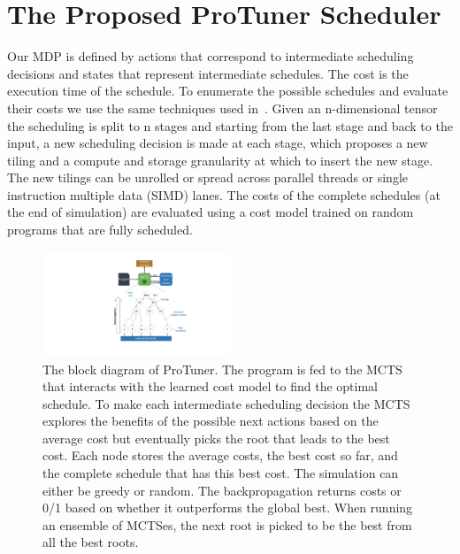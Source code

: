 \section{The Proposed ProTuner Scheduler}
Our MDP is defined by actions that correspond to intermediate scheduling decisions and states that represent intermediate schedules. The cost is the execution time of the schedule. To enumerate the possible schedules and evaluate their costs we use the same techniques used in~\cite{adams2019learning}. Given an n-dimensional tensor the scheduling is split to n stages and starting from the last stage and back to the input, a new scheduling decision is made at each stage, which proposes a new tiling and a compute and storage granularity at which to insert the new stage. The new tilings can be unrolled or spread across parallel threads or single instruction multiple data (SIMD) lanes. The costs of the complete schedules (at the end of simulation) are evaluated using a cost model trained on random programs that are fully scheduled. 
\begin{figure}[!t]
    \centering
    \includegraphics[width=0.5\textwidth,trim={12.7cm 2.5cm 7.5cm 1cm},clip]{figures/design.pdf}
    \caption{The block diagram of ProTuner. The program is fed to the MCTS that interacts with the learned cost model to find the optimal schedule. To make each intermediate scheduling decision the MCTS explores the benefits of the possible next actions based on the average cost but eventually picks the root that leads to the best cost. Each node stores the average costs, the best cost so far, and the complete schedule that has this best cost. The simulation can either be greedy or random. The backpropagation returns costs or 0/1 based on whether it outperforms the global best. When running an ensemble of MCTSes, the next root is picked to be the best from all the best roots.}
    \label{fig:design}
\end{figure}
